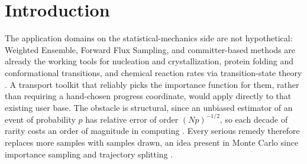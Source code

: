 \documentclass[11pt]{article}
\begin{document}
	\section{Introduction}
	\label{sec:intro}
	
	The application domains on the statistical-mechanics side are not hypothetical: Weighted Ensemble, Forward Flux Sampling, and committer-based
	methods are already the working tools for nucleation and crystallization, protein folding
	and conformational transitions, and chemical reaction rates via transition-state theory
	\cite{allen2009, zuckerman2017, e2006}. A transport toolkit that reliably picks the
	importance function for them, rather than requiring a hand-chosen progress coordinate,
	would apply directly to that existing user base. The obstacle is structural, since an unbiased estimator of an
	event of probability $p$ has relative error of order $(Np)^{-1/2}$, so each decade of
	rarity costs an order of magnitude in computing \cite{allen2009, touchette2009}. Every
	serious remedy therefore replaces more samples with samples drawn, an idea present in Monte Carlo since importance sampling and trajectory splitting \cite{kahn1951, kahn1953}.
	
\end{document}

